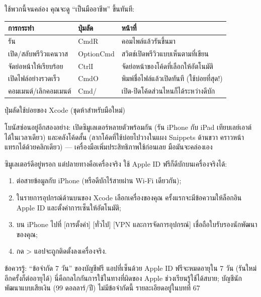 

ใช้พวกนี้จนคล่อง คุณจะดู “เป็นมืออาชีพ” ขึ้นทันที:

\begin{center}
\begin{tabularx}{\linewidth}{|X|X|X|}
\hline
\textbf{การกระทำ} & \textbf{ปุ่มลัด} & \textbf{หน้าที่} \tabularnewline
\hline
รัน & CmdR & คอมไพล์แล้วรันขึ้นมา \tabularnewline
เปิด/สลับพรีวิวแคนวาส & OptionCmd & สวิตช์เปิดพรีวิวแบบเห็นตามที่เขียน \tabularnewline
จัดย่อหน้าให้เรียบร้อย & CtrlI & จัดย่อหน้าของโค้ดที่เลือกให้อัตโนมัติ \tabularnewline
เปิดไฟล์อย่างรวดเร็ว & CmdO & พิมพ์ชื่อไฟล์แล้วเปิดทันที (ใช้บ่อยที่สุด!) \tabularnewline
คอมเมนต์/เลิกคอมเมนต์ & Cmd/ & เปิด-ปิดโค้ดส่วนไหนก็ได้ระหว่างดีบัก \tabularnewline
\hline
\end{tabularx}
\end{center}

\begin{center}\small\color{gray}ปุ่มลัดใช้บ่อยของ Xcode (ชุดห้าสำหรับมือใหม่)\end{center}

โบนัสซ่อนอยู่อีกสองอย่าง: เปิดซิมูเลเตอร์หลายตัวพร้อมกัน (รัน iPhone กับ iPad เทียบเลย์เอาต์ได้ในเวลาเดียว) และคลังโค้ดสั้น (ลากโค้ดที่ใช้บ่อยไปวางในแผง Snippets ด้านขวา คราวหน้าแทรกได้ด้วยคลิกเดียว) — เครื่องมือเพิ่มประสิทธิภาพใช้ก่อนเลย มือมันจะคล่องเอง


ซิมูเลเตอร์ดีอยู่หรอก แต่ปลายทางคือเครื่องจริง ใช้ Apple ID ฟรีก็ดีบักบนเครื่องจริงได้:

\begin{enumerate}
  \item ต่อสายข้อมูลกับ iPhone (หรือดีบักไร้สายผ่าน Wi-Fi เดียวกัน);
  \item ในรายการอุปกรณ์ด้านบนของ Xcode เลือกเครื่องของคุณ ครั้งแรกจะมีข้อความให้ล็อกอิน Apple ID และตั้งค่าการเซ็นให้อัตโนมัติ;
  \item บน iPhone ไปที่ [การตั้งค่า] [ทั่วไป] [VPN และการจัดการอุปกรณ์] เชื่อถือใบรับรองนักพัฒนาของคุณ;
  \item กด > แอปจะถูกติดตั้งลงเครื่องจริง.
\end{enumerate}

\begin{tcbwarn}{ข้อควรรู้: “ข้อจำกัด 7 วัน” ของบัญชีฟรี}
แอปที่เซ็นด้วย Apple ID ฟรีจะหมดอายุใน 7 วัน (รันใหม่อีกครั้งก็ต่ออายุได้) นี่คือกลไกกันการใช้ในทางที่ผิดของ Apple ช่วงเรียนรู้ใช้ได้สบาย; บัญชีนักพัฒนาแบบเสียเงิน (99 ดอลลาร์/ปี) ไม่มีข้อจำกัดนี้ รายละเอียดอยู่ในบทที่ 67

\end{tcbwarn}

